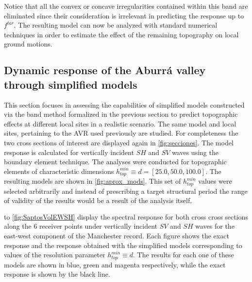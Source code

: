 \documentclass[11pt,letterpaper]{article}
\begin{document}
Notice that all the convex or concave irregularities contained within this band are eliminated since their consideration is irrelevant in predicting the response up to $f^{tar}$. The resulting model can now be analyzed with standard numerical techniques in order to estimate the effect of the remaining topography on local ground motions.

%
\subsection*{Dynamic response of the Aburrá valley through simplified models}
%
This section focuses in assessing the capabilities of simplified models constructed via the band method formalized in the previous section to predict topographic effects at different local sites in a realistic scenario. The same model and local sites, pertaining to the AVR used previously are studied. For completeness the two cross sections of interest are displayed again in \cref{fig:secciones}. The model response is calculated for vertically incident $SH$ and $SV$ waves using the boundary element technique. The analyses were conducted for topographic elements of characteristic dimensions $h_{top}^{min} \equiv d = [25.0 , 50.0 , 100.0]$. The resulting models are shown in \cref{fig:aprox_mods}. This set of  $h_{top}^{min}$ values were selected arbitrarily and instead of prescribing a target structural period the range of validity of the results would be a result of the analysis itself.

 to \cref{fig:SaptosVolEWSH} display the spectral response for both cross cross sections along the 6 receiver points under vertically incident $SV$ and $SH$ waves for the east-west component of the Manchester record. Each figure shows the exact response and the response obtained with the simplified models corresponding to values of the resolution parameter $h_{top}^{min} \equiv d$. The results for each one of these models are shown in blue, green and magenta respectively, while the exact response is shown by the black line.
\end{document}
